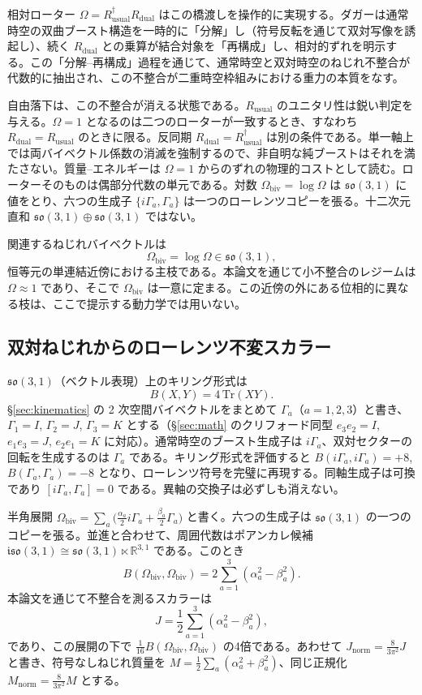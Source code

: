 \documentclass[a4paper]{article}
\newcommand{\Jnorm}{J_{\mathrm{norm}}}
\newcommand{\Mnorm}{M_{\mathrm{norm}}}
\begin{document}
相対ローター $\Omega = R_\text{usual}^\dagger R_\text{dual}$ はこの橋渡しを操作的に実現する。ダガーは通常時空の双曲ブースト構造を一時的に「分解」し（符号反転を通じて双対写像を誘起し）、続く $R_\text{dual}$ との乗算が結合対象を「再構成」し、相対的ずれを明示する。この「分解--再構成」過程を通じて、通常時空と双対時空のねじれ不整合が代数的に抽出され、この不整合が二重時空枠組みにおける重力の本質をなす。

自由落下は、この不整合が消える状態である。$R_{\mathrm{usual}}$ のユニタリ性は鋭い判定を与える。$\Omega=1$ となるのは二つのローターが一致するとき、すなわち $R_{\mathrm{dual}}=R_{\mathrm{usual}}$ のときに限る。反同期 $R_{\mathrm{dual}}=R_{\mathrm{usual}}^\dagger$ は別の条件である。単一軸上では両バイベクトル係数の消滅を強制するので、非自明な純ブーストはそれを満たさない。質量--エネルギーは $\Omega=1$ からのずれの物理的コストとして読む。ローターそのものは偶部分代数の単元である。対数 $\Omega_{\mathrm{biv}}=\log\Omega$ は $\mathfrak{so}(3,1)$ に値をとり、六つの生成子 $\{i\Gamma_a,\Gamma_a\}$ は一つのローレンツコピーを張る。十二次元直和 $\mathfrak{so}(3,1)\oplus\mathfrak{so}(3,1)$ ではない。

関連するねじれバイベクトルは
\[
\Omega_\text{biv} = \log \Omega \in \mathfrak{so}(3,1),
\]
恒等元の単連結近傍における主枝である。本論文を通じて小不整合のレジームは $\Omega \approx 1$ であり、そこで $\Omega_\text{biv}$ は一意に定まる。この近傍の外にある位相的に異なる枝は、ここで提示する動力学では用いない。

\subsection{双対ねじれからのローレンツ不変スカラー}

$\mathfrak{so}(3,1)$（ベクトル表現）上のキリング形式は
\[
B(X,Y) = 4\,\mathrm{Tr}(X Y).
\]
\S\ref{sec:kinematics} の 2 次空間バイベクトルをまとめて $\Gamma_a$（$a=1,2,3$）と書き、$\Gamma_1 = I$, $\Gamma_2 = J$, $\Gamma_3 = K$ とする（\S\ref{sec:math} のクリフォード同型 $e_3e_2 = I$, $e_1e_3 = J$, $e_2e_1 = K$ に対応）。通常時空のブースト生成子は $i\Gamma_a$、双対セクターの回転を生成するのは $\Gamma_a$ である。キリング形式を評価すると $B(i\Gamma_a, i\Gamma_a) = +8$, $B(\Gamma_a, \Gamma_a) = -8$ となり、ローレンツ符号を完璧に再現する。同軸生成子は可換であり $[i\Gamma_a,\Gamma_a]=0$ である。異軸の交換子は必ずしも消えない。

半角展開 $\Omega_\text{biv}=\sum_a\bigl(\frac{\alpha_a}{2}i\Gamma_a+\frac{\beta_a}{2}\Gamma_a\bigr)$ と書く。六つの生成子は $\mathfrak{so}(3,1)$ の一つのコピーを張る。並進と合わせて、周囲代数はポアンカレ候補~\cite{poincare1906} $\mathfrak{iso}(3,1)\cong\mathfrak{so}(3,1)\ltimes\mathbb{R}^{3,1}$ である。このとき
\[
B(\Omega_\text{biv},\Omega_\text{biv})=2\sum_{a=1}^3(\alpha_a^2-\beta_a^2).
\]
本論文を通じて不整合を測るスカラーは
\begin{equation}
\label{eq:J-def}
J=\frac12\sum_{a=1}^3(\alpha_a^2-\beta_a^2),
\end{equation}
であり、この展開の下で $\frac1{16}B(\Omega_\text{biv},\Omega_\text{biv})$ の4倍である。あわせて $\Jnorm=\frac8{3\pi^2}J$ と書き、符号なしねじれ質量を $M=\frac12\sum_a(\alpha_a^2+\beta_a^2)$、同じ正規化 $\Mnorm=\frac8{3\pi^2}M$ とする。
\end{document}
